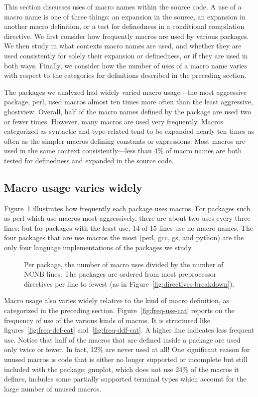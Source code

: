 \documentclass[10pt]{article}
\newcommand{\pkg}[1]{\textsf{#1}}
\begin{document}
This section discusses uses of macro names within the source code.  A
use of a macro name is one of three things: an expansion in the source,
an expansion in another macro definition, or a test for definedness in a
conditional compilation directive.  We first consider how frequently
macros are used by various packages.  We then study in what contexts
macro names are used, and whether they are used consistently for solely
their expansion or definedness, or if they are used in both ways.
Finally, we consider how the number of uses of a macro name varies with
respect to the categories for definitions described in the preceding
section.

The packages we analyzed had widely varied macro usage---the most
aggressive package, \pkg{perl}, used macros almost ten times more often
than the least aggressive, \pkg{ghostview}.  Overall, half of the macro
names defined by the package are used two or fewer times.  However, many
macros are used very frequently.  Macros categorized as syntactic and
type-related tend to be expanded nearly ten times as often as the
simpler macros defining constants or expressions.  Most macros are used
in the same context consistently---less than 4\% of macro names are both
tested for definedness and expanded in the source code.

\subsection{Macro usage varies widely}

Figure~\ref{fig:use-per-line} illustrates how frequently each package
uses macros.  For packages such as \pkg{perl} which use macros most
aggressively, there are about two uses every three lines;  but for
packages with the least use, 14 of 15 lines use no macro names.
The four packages that are use macros the most
(\pkg{perl}, \pkg{gcc}, \pkg{gs}, and \pkg{python}) are the
only four language implementations of the packages we study.

\begin{figure}
\centerline{}
\caption{Per package, the number of macro uses divided by the number of
  NCNB lines.  The packages are ordered from most preprocessor
  directives per line to fewest (as in
  Figure~\ref{fig:directives-breakdown}).}
\label{fig:use-per-line}
\end{figure}

Macro usage also varies widely relative to the kind of macro definition,
as categorized in the preceding section.  Figure~\ref{fig:freq-use-cat}
reports on the frequency of use of the various kinds of macros.  It is
structured like figures~\ref{fig:freq-def-cat}
and~\ref{fig:freq-ddf-cat}. A higher line indicates less frequent use.
Notice that half of the macros that are defined inside a package are
used only twice or fewer.  In fact, 12\% are never used at all!  One
significant reason for unused macros is code that is either no longer
supported or incomplete but still included with the package;
\pkg{gnuplot}, which does not use 24\% of the macros it defines,
includes some partially supported terminal types which account for the
large number of unused macros.
\end{document}

